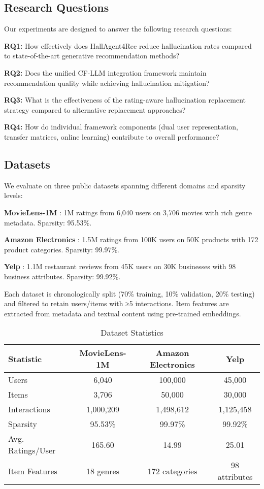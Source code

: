 \documentclass[acmsmall]{acmart}
\begin{document}
\subsection{Research Questions}
Our experiments are designed to answer the following research questions:

\textbf{RQ1:} How effectively does HallAgent4Rec reduce hallucination rates compared to state-of-the-art generative recommendation methods?

\textbf{RQ2:} Does the unified CF-LLM integration framework maintain recommendation quality while achieving hallucination mitigation?

\textbf{RQ3:} What is the effectiveness of the rating-aware hallucination replacement strategy compared to alternative replacement approaches?

\textbf{RQ4:} How do individual framework components (dual user representation, transfer matrices, online learning) contribute to overall performance?

\subsection{Datasets}
We evaluate on three public datasets spanning different domains and sparsity levels:

\textbf{MovieLens-1M} \cite{harper2015movielens}: 1M ratings from 6,040 users on 3,706 movies with rich genre metadata. Sparsity: 95.53\%.

\textbf{Amazon Electronics} \cite{he2016ups}: 1.5M ratings from 100K users on 50K products with 172 product categories. Sparsity: 99.97\%.

\textbf{Yelp} \cite{yelp2025}: 1.1M restaurant reviews from 45K users on 30K businesses with 98 business attributes. Sparsity: 99.92\%.

Each dataset is chronologically split (70\% training, 10\% validation, 20\% testing) and filtered to retain users/items with ≥5 interactions. Item features are extracted from metadata and textual content using pre-trained embeddings.

\begin{table}[h]
\centering
\caption{Dataset Statistics}
\label{tab:dataset-statistics}
\small
\begin{tabular}{lccc}
\toprule
\textbf{Statistic} & \textbf{MovieLens-1M} & \textbf{Amazon Electronics} & \textbf{Yelp} \\
\midrule
Users & 6,040 & 100,000 & 45,000 \\
Items & 3,706 & 50,000 & 30,000 \\
Interactions & 1,000,209 & 1,498,612 & 1,125,458 \\
Sparsity & 95.53\% & 99.97\% & 99.92\% \\
Avg. Ratings/User & 165.60 & 14.99 & 25.01 \\
Item Features & 18 genres & 172 categories & 98 attributes \\
\bottomrule
\end{tabular}
\end{table}
\end{document}
